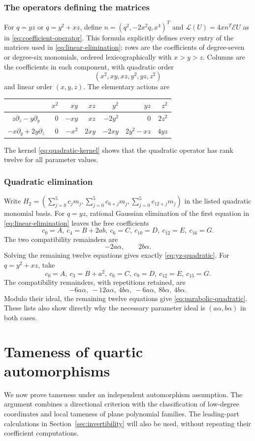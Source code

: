 \documentclass[11pt,reqno]{amsart}
\numberwithin{equation}{section}
\theoremstyle{plain}
\theoremstyle{definition}
\theoremstyle{remark}
\newcommand{\calE}{\mathcal E}
\begin{document}
\subsubsection{The operators defining the matrices}
For $q=yz$ or $q=y^2+xz$, define $n=(q^2,-2x^2q,x^4)^T$ and $\mathcal L(U)=4x n^T\calE U$ as in \eqref{eq:coefficient-operator}. This formula explicitly defines every entry of the matrices used in \eqref{eq:linear-elimination}; rows are the coefficients of degree-seven or degree-six monomials, ordered lexicographically with $x>y>z$. Columns are the coefficients in each component, with quadratic order
\[
(x^2,xy,xz,y^2,yz,z^2)
\]
and linear order $(x,y,z)$. The elementary actions are
\begin{center}
\begin{tabular}{c|rrrrrr}
& $x^2$&$xy$&$xz$&$y^2$&$yz$&$z^2$\\\hline
$z\partial_z-y\partial_y$&$0$&$-xy$&$xz$&$-2y^2$&$0$&$2z^2$\\
$-x\partial_y+2y\partial_z$&$0$&$-x^2$&$2xy$&$-2xy$&$2y^2-xz$&$4yz$
\end{tabular}
\end{center}
The kernel \eqref{eq:quadratic-kernel} shows that the quadratic operator
has rank twelve for all parameter values.

\subsubsection{Quadratic elimination}
Write $H_2=(\sum_{j=0}^5c_jm_j,\sum_{j=0}^5c_{6+j}m_j,\sum_{j=0}^5c_{12+j}m_j)$ in the listed quadratic monomial basis. For $q=yz$, rational Gaussian elimination of the first equation in \eqref{eq:linear-elimination} leaves the free coefficients
\[
c_0=A,\ c_4=B+2ab,\ c_6=C,\ c_{10}=D,\ c_{12}=E,\ c_{16}=G.
\]
The two compatibility remainders are
\[
-2a\alpha,\qquad 2b\alpha.
\]
Solving the remaining twelve equations gives exactly \eqref{eq:yz-quadratic}.
For $q=y^2+xz$, take
\[
c_0=A,\ c_3=B+a^2,\ c_6=C,\ c_9=D,\ c_{12}=E,\ c_{15}=G.
\]
The compatibility remainders, with repetitions retained, are
\[
-6a\alpha,\ -12a\alpha,\ 4b\alpha,\ -6a\alpha,\ 8b\alpha,\ 4b\alpha.
\]
Modulo their ideal, the remaining twelve equations give \eqref{eq:parabolic-quadratic}. These lists also show directly why the necessary parameter ideal is $(a\alpha,b\alpha)$ in both cases.

\section{Tameness of quartic automorphisms}\label{sec:tameness}
We now prove tameness under an independent automorphism assumption.
The argument combines a directional criterion with the classification of
low-degree coordinates and local tameness of plane polynomial families.
The leading-part calculations in Section~\ref{sec:invertibility} will
also be used, without repeating their coefficient computations.
\end{document}

